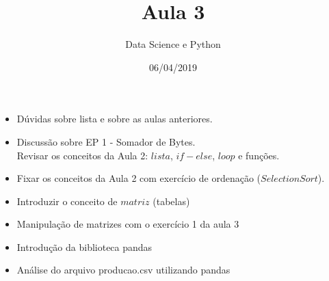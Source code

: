\documentclass[12]{article}
\title{Aula 3}
\author{Data Science e Python}
\date{06/04/2019}
\begin{document}
	\maketitle
	\begin{itemize}
		\item
			Dúvidas sobre lista e sobre as aulas anteriores.
		\item
			Discussão sobre EP 1 - Somador de Bytes.\\
			Revisar os conceitos da Aula 2: $lista$,  $if-else$, $loop$ e funções.
		\item
			Fixar os conceitos da Aula 2 com exercício de ordenação ($Selection
			 Sort$).
		\item
			Introduzir o conceito de $matriz$ (tabelas)
		\item
			Manipulação de matrizes com o exercício 1 da aula 3
		\item			 	
			Introdução da biblioteca pandas
		\item
			Análise do arquivo producao.csv utilizando pandas 	
	\end{itemize}
\end{document}
